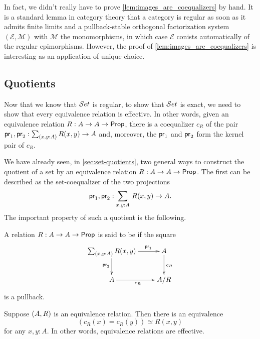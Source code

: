 In fact, we didn't really have to prove \autoref{lem:images_are_coequalizers} by hand.
It is a standard lemma in category theory that a category is regular as soon as it admits finite limits and a pullback-stable orthogonal factorization system $(\mathcal{E},\mathcal{M})$ with $\mathcal{M}$ the monomorphisms, in which case $\mathcal{E}$ conists automatically of the regular epimorphisms.
However, the proof of \autoref{lem:images_are_coequalizers} is interesting as an application of unique choice.


\subsection{Quotients}\label{subsec:quotients}
Now that we know that $\mathcal{S}et$ is regular, to show that $\mathcal{S}et$ is exact, we need to show that every
equivalence relation is effective. In other words, given an equivalence
relation $R:A\to A\to\mathsf{Prop}$, there is a coequalizer $c_R$ of the pair
$\proj1,\proj2:\sm{x,y:A} R(x,y)\to A$ and, moreover, the $\mathsf{pr}_{1}$ and $\mathsf{pr}_{2}$
form the kernel pair of $c_R$.

We have already seen, in \autoref{sec:set-quotients}, two general ways to construct the quotient of a set by an equivalence relation $R:A\to A\to\mathsf{Prop}$.
The first can be described as the set-coequalizer of the two projections
\[\proj1,\proj2:\sm{x,y:A} R(x,y)\to A.\]
The important property of such a quotient is the following.

\begin{defn}
A relation $R:A\to A\to\mathsf{Prop}$ is said to be  if the square
\begin{equation*}
  \xymatrix{
    {\sm{x,y:A} R (x,y)}
    \ar[r]^(0.7){\proj1}
    \ar[d]_{\proj2}
    &
    {A}
    \ar[d]^{c_R}
    \\
    {A}
    \ar[r]_{c_R}
    &
    {A/R}
    }
\end{equation*}
is a pullback. 
\end{defn}

\begin{lem}\label{lem:sets_exact}
Suppose ${(A,R)}$ is an equivalence relation. Then there is an equivalence
\begin{equation*}
(c_R(x)= c_R(y))\simeq R(x,y)
\end{equation*}
for any $x,y:A$. In other words, equivalence relations are effective.
\end{lem}

